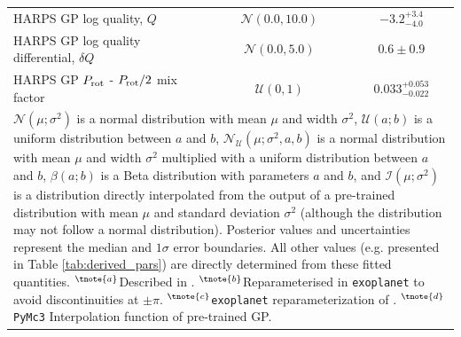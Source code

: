 \documentclass[fleqn,usenatbib]{mnras}
\newcommand{\harps}{{HARPS}}
\begin{document}
\begin{table}
\begin{center}
\begin{tabular}{lcc}
\harps{} GP log quality, $Q$ &  $\mathcal{N}(0.0,10.0)$  &   $ -3.2^{+3.4}_{-4.0} $ \\
\harps{} GP log quality differential, $\delta Q$ &  $\mathcal{N}(0.0,5.0)$  &   $ 0.6 \pm 0.9 $ \\
\harps{} GP $P_{\rm rot}$ - $P_{\rm rot}/2$ mix factor &  $\mathcal{U}(0,1)$  &   $ 0.033^{+0.053}_{-0.022} $ \\
\hline
\hline
\multicolumn{3}{l}{%
  \begin{minipage}{14cm}%
    $\mathcal{N}(\mu;\sigma^{2})$ is a normal distribution with mean $\mu$ and width $\sigma^{2}$, $\mathcal{U}(a;b)$ is a uniform distribution between $a$ and $b$, $\mathcal{N}_{\mathcal{U}}(\mu;\sigma^{2},a,b)$ is a normal distribution with mean $\mu$ and width $\sigma^{2}$ multiplied with a uniform distribution between $a$ and $b$, $\beta(a;b)$ is a Beta distribution with parameters $a$ and $b$, and $\mathcal{I}(\mu;\sigma^2)$ is a distribution directly interpolated from the output of a pre-trained distribution with mean $\mu$ and standard deviation $\sigma^2$ (although the distribution may not follow a normal distribution).  Posterior values and uncertainties represent the median and $1\sigma$ error boundaries. All other values (e.g. presented in Table \ref{tab:derived_pars}) are directly determined from these fitted quantities. $^{\tnote{a}}$Described in \citet{kipping2013parametrizing}.  $^{\tnote{b}}$Reparameterised in \texttt{exoplanet} to avoid discontinuities at $\pm\pi$. $^{\tnote{c}}$\texttt{exoplanet} reparameterization of \citet{espinoza2018efficient}. $^{\tnote{d}}$\texttt{PyMc3} Interpolation function of pre-trained GP.
  \end{minipage}%
}\\
\end{tabular}
\end{center}
\label{AllPriors}
\end{table}%
\end{document}
